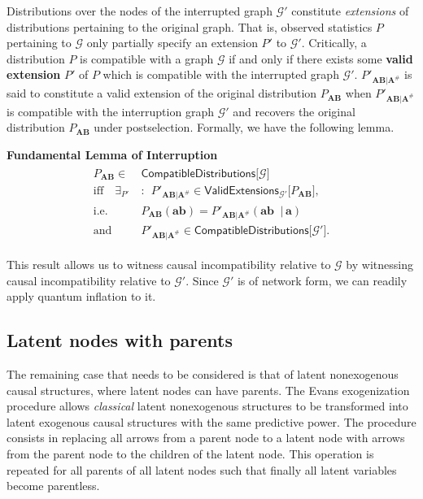 \documentclass[superscriptaddress,aps,prx,nofootinbib,twocolumn,twoside,reprint,letterpaper,longbibliography]{revtex4-2}
\newcommand{\term}[1]{\textcolor{medblue}{\textbf{#1}}}
\begin{document}
Distributions over the nodes of the interrupted graph $\mathcal{G}'$ constitute \emph{extensions} of distributions pertaining to the original graph. That is, observed statistics $P$ pertaining to $\mathcal{G}$ only partially specify an extension $P'$ to $\mathcal{G}'$. Critically, a distribution $P$ is compatible with a graph $\mathcal{G}$ if and only if there exists some \term{valid extension} $P'$ of $P$ which is compatible with the interrupted graph  $\mathcal{G}'$. $P'_{\boldsymbol{AB}\vert\boldsymbol{A}^\#}$ is said to constitute a valid extension of the original distribution $P_{\boldsymbol{AB}}$ when $P'_{\boldsymbol{AB}\vert\boldsymbol{A}^\#}$ is compatible with the interruption graph  $\mathcal{G}'$ and recovers the original distribution $P_{\boldsymbol{AB}}$  under postselection. Formally, we have the following lemma.\par
\medskip
\begin{samepage}
  \noindent\textbf{Fundamental Lemma of Interruption}
  \begin{align}\begin{split}\label{eq:interruption}
    P_{\boldsymbol{A}\boldsymbol{B}}\in & \textsf{CompatibleDistributions}\big[\mathcal{G}\big]\\
    \text{iff}\quad \exists_{P'}\:& :\:\: P'_{\boldsymbol{AB}\vert\boldsymbol{A}^\#} \in \textsf{ValidExtensions}_{\mathcal{G'}}\big[P_{\boldsymbol{AB}}\big],\\
    \text{i.e.}\quad & P_{\boldsymbol{AB}}(\boldsymbol{ab})=P'_{\boldsymbol{AB}\vert\boldsymbol{A}^\#}(\boldsymbol{ab} \;\;\vert\,\boldsymbol{a})\\
    \text{and}\quad & P'_{\boldsymbol{A}\boldsymbol{B}\vert\boldsymbol{A}^\#}\in \textsf{CompatibleDistributions}\big[\mathcal{G'}\big].
  \end{split}\end{align}
\end{samepage}

This result allows us to witness causal incompatibility relative to $\mathcal{G}$ by witnessing causal incompatibility relative to $\mathcal{G}'$. Since $\mathcal{G}'$ is of network form, we can readily apply quantum inflation to it.

\subsection{Latent nodes with parents}\label{sec:nonexog}
The remaining case that needs to be considered is that of latent nonexogenous causal structures, where latent nodes can have parents.
The Evans exogenization procedure \cite{Evans2018NMP} allows \emph{classical} latent nonexogenous structures to be transformed into latent exogenous causal structures with the same predictive power. The procedure consists in replacing all arrows from a parent node to a latent node with arrows from the parent node to the children of the latent node. This operation is repeated for all parents of all latent nodes such that finally all latent variables become parentless.
\end{document}
